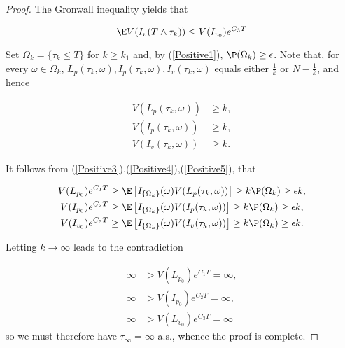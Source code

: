\begin{proof}
	The Gronwall inequality yields that
	
	\begin{equation}\label{Positive5}
		\E V(I_v(T\wedge \tau_k))\leq V(I_{v_0})e^{C_3 T}
	\end{equation}
	
	Set $\Omega_k =\{\tau_k\leq T\}$ for $k\geq k_1$ and, by (\ref{Positive1}), $\P (\Omega_k)\geq \epsilon$. Note that, for every $\omega\in \Omega_k$,
	$L_p(\tau_k,\omega),I_p(\tau_k,\omega),I_v(\tau_k,\omega)$ equals either $\frac{1}{k}$ or $N-\frac{1}{k}$, and hence
	
	\begin{align*}
		V(L_p(\tau_k,\omega))&\geq k,\\
		V(I_p(\tau_k,\omega))&\geq k,\\
		V(I_v(\tau_k,\omega))&\geq k.
	\end{align*}
	
	It follows from (\ref{Positive3}),(\ref{Positive4}),(\ref{Positive5}), that
	
	\begin{align*}
		V(L_{p_0})e^{C_1 T} 
			&\geq 
				\E \left[I_{\{\Omega_k\}}(\omega)V(L_p(\tau_k,\omega))\right]\geq k\P (\Omega_k)\geq \epsilon k,\\
		V(I_{p_0})e^{C_2 T} 
			&\geq 
				\E\left[I_{\{\Omega_k\}}(\omega)V(I_p(\tau_k,\omega))\right]\geq k\P (\Omega_k)\geq \epsilon k,\\
		V(I_{v_0})e^{C_3 T} 
			&\geq 
				\E\left[I_{\{\Omega_k\}}(\omega)V(I_v(\tau_k,\omega))\right]\geq k\P (\Omega_k)\geq \epsilon k.
	\end{align*}
	
	Letting $k\rightarrow \infty$ leads to the contradiction
	
	\begin{align*}
		\infty &>V(L_{p_0})e^{C_1 T}= \infty, \\
		\infty &>V(I_{p_0})e^{C_2 T}= \infty, \\
		\infty &>V(L_{v_0})e^{C_3 T}= \infty 
	\end{align*}
	so we must therefore have $\tau_\infty=\infty$ a.s., whence the proof is complete.
\end{proof}
